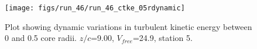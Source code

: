 \begin{figure}[H]
\centering
\texttt{[image: figs/run\_46/run\_46\_ctke\_05rdynamic]}
\caption{Plot showing dynamic variations in turbulent kinetic energy between 0 and 0.5 core radii. $z/c$=9.00, $V_{free}$=24.9, station 5.}
\label{fig:run_46_ctke_05rdynamic}
\end{figure}


